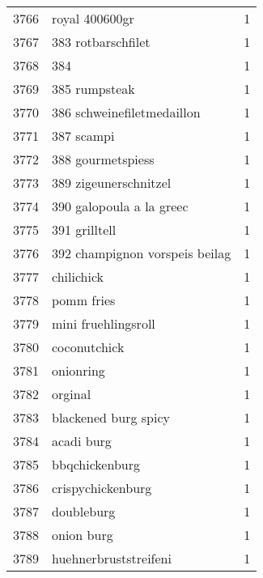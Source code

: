 \begin{tabular}{llr}
3766 &                                     royal 400600gr &      1 \\
3767 &                                 383 rotbarschfilet &      1 \\
3768 &                                                384 &      1 \\
3769 &                                      385 rumpsteak &      1 \\
3770 &                         386 schweinefiletmedaillon &      1 \\
3771 &                                         387 scampi &      1 \\
3772 &                                  388 gourmetspiess &      1 \\
3773 &                              389 zigeunerschnitzel &      1 \\
3774 &                           390 galopoula a la greec &      1 \\
3775 &                                      391 grilltell &      1 \\
3776 &                     392 champignon vorspeis beilag &      1 \\
3777 &                                         chilichick &      1 \\
3778 &                                         pomm fries &      1 \\
3779 &                                mini fruehlingsroll &      1 \\
3780 &                                       coconutchick &      1 \\
3781 &                                          onionring &      1 \\
3782 &                                            orginal &      1 \\
3783 &                               blackened burg spicy &      1 \\
3784 &                                         acadi burg &      1 \\
3785 &                                     bbqchickenburg &      1 \\
3786 &                                  crispychickenburg &      1 \\
3787 &                                         doubleburg &      1 \\
3788 &                                         onion burg &      1 \\
3789 &                              huehnerbruststreifeni &      1 \\

\end{tabular}
